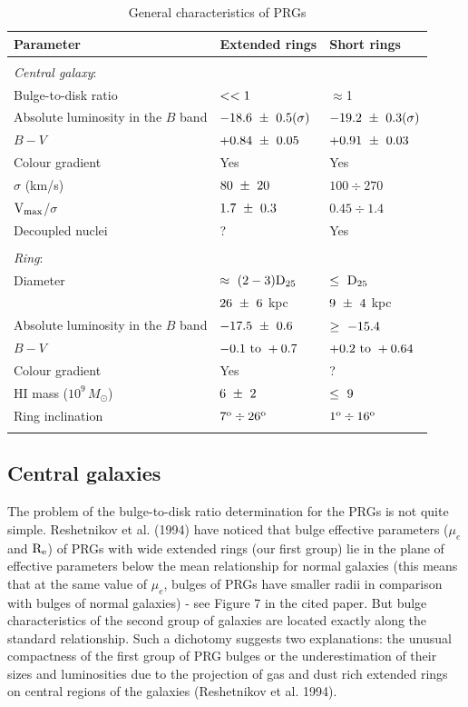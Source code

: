 \begin{table}
\caption[1]{General characteristics of PRGs}
\begin{tabular}{lll}
\\
\hline
Parameter & Extended rings & Short rings \\
\hline \\ 

{\it Central galaxy}: \\ 
Bulge-to-disk ratio & $\rm <<1$  &  $\approx$1 \\ 
Absolute luminosity in the $B$ band & $\rm -18.6~\pm~0.5(\sigma)$ & $\rm
-19.2~\pm~0.3(\sigma)$ \\ 
$B-V$    & $\rm +0.84~\pm~0.05$ & $\rm +0.91~\pm~0.03$ \\ 
Colour gradient & Yes & Yes \\ 
$\sigma$ (km/s) & $\rm 80~\pm~20$ & $100 \div 270$ \\ 
$\rm V_{max}$/$\sigma$ & $\rm 1.7~\pm~0.3$ & $0.45 \div 1.4$ \\ 
Decoupled nuclei &  ? & Yes \\ \\

{\it Ring}:\\
Diameter        & $\rm \approx~(2 - 3)D_{25}$ & $\rm \leq~D_{25}$ \\
                & $\rm 26~\pm~6$ kpc &  $\rm 9~\pm~4$ kpc         \\ 
Absolute luminosity in the $B$ band   & $\rm -17.5~\pm~0.6$ & $\rm \geq~-15.4$ \\
$B-V$  &  $\rm -0.1~to~+0.7$ &  $\rm +0.2~to~+0.64$ \\
Colour gradient & Yes & ?  \\
HI mass ($10^{9}\,M_{\odot}$) & $\rm 6~\pm~2$  & $\rm \leq~9$ \\ 
Ring inclination & $\rm 7^{o} \div 26^{o}$ & $\rm 1^{o} \div 16^{o}$ \\ \\
\hline
\end{tabular}
\end{table}


\subsection{Central galaxies}

The problem of the bulge-to-disk ratio determination for the PRGs is not
quite simple. Reshetnikov et al. (1994) have noticed that bulge effective
parameters ($\mu_{e}$ and $\rm R_{e}$) of PRGs with 
wide extended rings (our first group) lie in the plane of
effective parameters below the mean relationship for normal
galaxies (this means that at the same value of $\mu_{e}$, bulges
of PRGs have smaller radii in comparison with bulges of normal galaxies) -
see Figure 7 in the cited paper. 
But bulge characteristics of the second group of galaxies are
located exactly along the standard relationship. Such a dichotomy
suggests two explanations: the unusual compactness of the first
group of PRG bulges or the underestimation of their sizes and
luminosities due to
the projection of gas and dust rich extended rings on central
regions of the galaxies (Reshetnikov et al. 1994).

